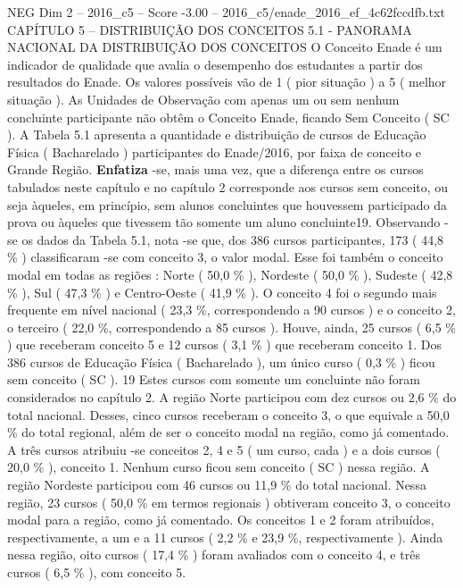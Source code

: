 \begin{textsample}{NEG Dim 2 – 2016\_c5 – Score -3.00 – 2016\_c5/enade\_2016\_ef\_4c62fccdfb.txt}  \label{ex:f2_neg_033}
CAPÍTULO 5 – DISTRIBUIÇÃO DOS CONCEITOS 5.1 - PANORAMA NACIONAL DA DISTRIBUIÇÃO DOS CONCEITOS O Conceito Enade é um indicador de qualidade que avalia o desempenho dos estudantes a partir dos resultados do Enade.
Os valores possíveis vão de 1 ( pior situação ) a 5 ( melhor situação ).
As Unidades de Observação com apenas um ou sem nenhum concluinte participante não obtêm o Conceito Enade, ficando Sem Conceito ( SC ).
A Tabela 5.1 apresenta a quantidade e distribuição de cursos de Educação Física ( Bacharelado ) participantes do Enade/2016, por faixa de conceito e Grande Região. \textbf{Enfatiza} -se, mais uma vez, que a diferença entre os cursos tabulados neste capítulo e no capítulo 2 corresponde aos cursos sem conceito, ou seja àqueles, em princípio, sem alunos concluintes que houvessem participado da prova ou àqueles que tivessem tão somente um aluno concluinte19.
Observando -se os dados da Tabela 5.1, nota -se que, dos 386 cursos participantes, 173 ( 44,8 \% ) classificaram -se com conceito 3, o valor modal.
Esse foi também o conceito modal em todas as regiões : Norte ( 50,0 \% ), Nordeste ( 50,0 \% ), Sudeste ( 42,8 \% ), Sul ( 47,3 \% ) e Centro-Oeste ( 41,9 \% ).
O conceito 4 foi o segundo mais frequente em nível nacional ( 23,3 \%, correspondendo a 90 cursos ) e o conceito 2, o terceiro ( 22,0 \%, correspondendo a 85 cursos ).
Houve, ainda, 25 cursos ( 6,5 \% ) que receberam conceito 5 e 12 cursos ( 3,1 \% ) que receberam conceito 1.
Dos 386 cursos de Educação Física ( Bacharelado ), um único curso ( 0,3 \% ) ficou sem conceito ( SC ). 19 Estes cursos com somente um concluinte não foram considerados no capítulo 2.
A região Norte participou com dez cursos ou 2,6 \% do total nacional.
Desses, cinco cursos receberam o conceito 3, o que equivale a 50,0 \% do total regional, além de ser o conceito modal na região, como já comentado.
A três cursos atribuiu -se conceitos 2, 4 e 5 ( um curso, cada ) e a dois cursos ( 20,0 \% ), conceito 1.
Nenhum curso ficou sem conceito ( SC ) nessa região.
A região Nordeste participou com 46 cursos ou 11,9 \% do total nacional.
Nessa região, 23 cursos ( 50,0 \% em termos regionais ) obtiveram conceito 3, o conceito modal para a região, como já comentado.
Os conceitos 1 e 2 foram atribuídos, respectivamente, a um e a 11 cursos ( 2,2 \% e 23,9 \%, respectivamente ).
Ainda nessa região, oito cursos ( 17,4 \% ) foram avaliados com o conceito 4, e três cursos ( 6,5 \% ), com conceito 5.

\end{textsample}
